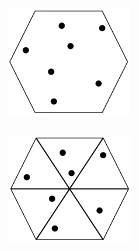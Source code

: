 \documentclass[12pt, letterpaper]{article}
\begin{document}
\begin{minipage}[t]{0.15\linewidth}
    \begin{center}
		\strut\vspace*{-\baselineskip}\newline\hspace*{0.5cm}\includegraphics[width=\linewidth]{images/pigeon/hex.png}
		\strut\vspace*{-\baselineskip}\newline\hspace*{0.5cm}\includegraphics[width=\linewidth]{images/pigeon/hex2.png}	
	\end{center}
    
\end{minipage}
\end{document}
